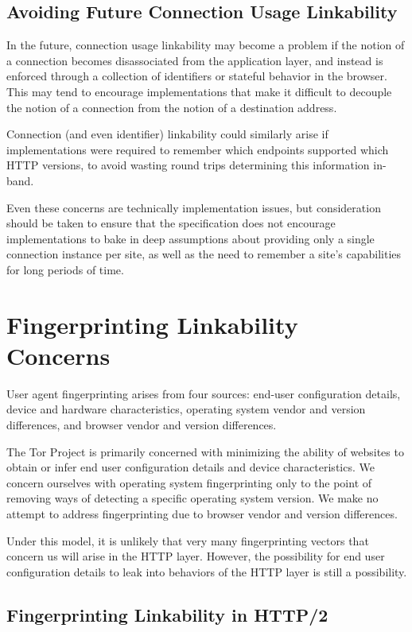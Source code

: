 \documentclass[letterpaper,11pt]{llncs}
\begin{document}
\subsection{Avoiding Future Connection Usage Linkability}

In the future, connection usage linkability may become a problem if the notion
of a connection becomes disassociated from the application layer, and instead
is enforced through a collection of identifiers or stateful behavior in the
browser. This may tend to encourage implementations that make it difficult to
decouple the notion of a connection from the notion of a destination address.

Connection (and even identifier) linkability could similarly arise if
implementations were required to remember which endpoints supported which HTTP
versions, to avoid wasting round trips determining this information in-band.

Even these concerns are technically implementation issues, but consideration
should be taken to ensure that the specification does not encourage
implementations to bake in deep assumptions about providing only a single
connection instance per site, as well as the need to remember a site's
capabilities for long periods of time.

\section{Fingerprinting Linkability Concerns}

User agent fingerprinting arises from four sources: end-user configuration
details, device and hardware characteristics, operating system vendor and
version differences, and browser vendor and version differences.

The Tor Project is primarily concerned with minimizing the ability of websites
to obtain or infer end user configuration details and device characteristics.
We concern ourselves with operating system fingerprinting only to the point of
removing ways of detecting a specific operating system version. We make no
attempt to address fingerprinting due to browser vendor and version
differences\cite{torbrowser-fingerprinting}.

Under this model, it is unlikely that very many fingerprinting vectors that
concern us will arise in the HTTP layer. However, the possibility for end user
configuration details to leak into behaviors of the HTTP layer is still a
possibility.

\subsection{Fingerprinting Linkability in HTTP/2}
\end{document}
